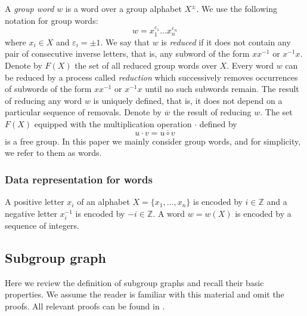 \documentclass[12pt,oneside]{amsart}
\theoremstyle{definition}
\theoremstyle{case}
\def\ovw{{\overline{w}}}
\def\MZ{{\mathbb{Z}}}
\begin{document}
A \emph{group word} $w$ is a word over a group alphabet $X^\pm$.
We use the following notation for group words:
$$
w= x_1^{\varepsilon_1} \dots x_n^{\varepsilon_n}
$$
where $x_i\in X$ and $\varepsilon_i = \pm 1$.
We say that $w$ is \emph{reduced} if it does not contain any pair 
of consecutive inverse letters, that is, any subword of the form
$x x^{-1}$ or $x^{-1} x$.
Denote by $F(X)$ the set of all reduced group words over $X$.
Every word $w$ can be reduced by a process called \emph{reduction}
which successively removes occurrences of subwords of the form
$x x^{-1}$ or $x^{-1} x$
until no such subwords remain.
The result of reducing any word $w$
is uniquely defined, that is, it does not depend on a particular 
sequence of removals.
Denote by $\ovw$ the result of reducing $w$.
The set $F(X)$ equipped with the multiplication
operation $\cdot$ defined by
$$
u\cdot v = \overline{u\circ v}
$$
is a free group. 
In this paper we mainly consider group words, and for simplicity,
we refer to them as words.


\subsubsection{Data representation for words}
\label{se:data-words}

A positive letter $x_i$ of an alphabet $X=\{x_1,\dots,x_n\}$ is encoded
by $i\in\MZ$ and a negative letter $x_i^{-1}$ is encoded
by $-i\in\MZ$. A word $w=w(X)$ is encoded by a sequence of integers.


\subsection{Subgroup graph}

Here we review the definition of subgroup graphs and recall 
their basic properties.
We assume the reader is familiar with this material
and omit the proofs. All relevant proofs 
can be found in \cite{Kapovich_Miasnikov:2002}.
\end{document}
